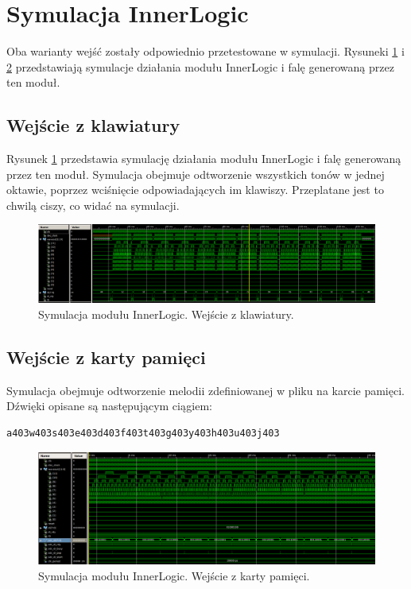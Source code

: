 \documentclass[12pt]{article}
\begin{document}
\section{Symulacja InnerLogic}
Oba warianty wejść zostały odpowiednio przetestowane w symulacji. Rysuneki \ref{sim:kb} i \ref{sim:sd} przedstawiają symulacje działania modułu InnerLogic i falę generowaną przez ten moduł.
\subsection{Wejście z klawiatury}
Rysunek \ref{sim:kb} przedstawia symulację działania modułu InnerLogic i falę generowaną przez ten moduł. Symulacja obejmuje odtworzenie wszystkich tonów w jednej oktawie, poprzez wciśnięcie odpowiadających im klawiszy. Przeplatane jest to chwilą ciszy, co widać na symulacji.
\begin{figure}[h]
  \centering
  \includegraphics[decodearray={1 0 1 0 1 0}, width=\linewidth]{images/inner_sim_kb}
  \caption{Symulacja modułu InnerLogic. Wejście z klawiatury.}
  \label{sim:kb}
\end{figure}

\subsection{Wejście z karty pamięci}
Symulacja obejmuje odtworzenie melodii zdefiniowanej w pliku na karcie pamięci. Dźwięki opisane są następującym ciągiem:
\begin{lstlisting}
a403w403s403e403d403f403t403g403y403h403u403j403
\end{lstlisting}
\begin{figure}[h]
  \centering
  \includegraphics[decodearray={1 0 1 0 1 0}, width=\linewidth]{images/inner_sim_sd}
  \caption{Symulacja modułu InnerLogic. Wejście z karty pamięci.}
  \label{sim:sd}
\end{figure}
\clearpage
\end{document}
